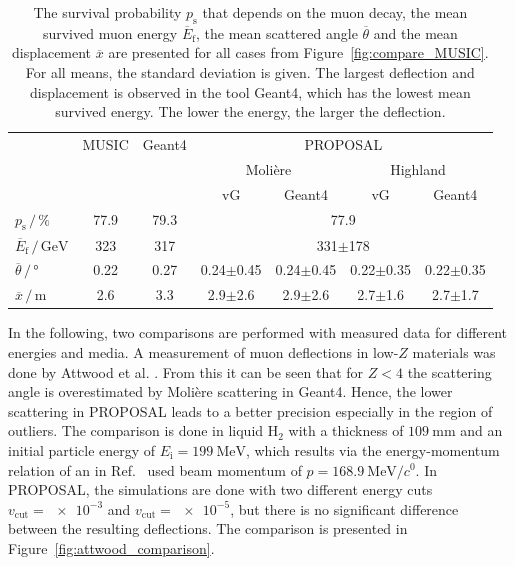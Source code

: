 \begin{table}
    \small
    \centering
    \caption{The survival probability $p_{\text{s}}$ that depends on the muon decay, the mean survived muon 
    energy $\overline{E}_{\text{f}}$, the mean scattered angle $\overline{\theta}$ 
    and the mean displacement $\overline{x}$ are presented for all cases from 
    Figure~\ref{fig:compare_MUSIC}. For all means, the standard deviation is given.
    The largest deflection and displacement is observed in the tool Geant4, which has the lowest mean survived energy. The lower the energy, the larger the deflection.}
    \begin{tabular}{l|cc|cccc}
        \toprule
        & MUSIC & Geant4 & \multicolumn{4}{c}{PROPOSAL} \\
        &  & & \multicolumn{2}{c}{Molière} & \multicolumn{2}{c}{Highland} \\
        &  &  & vG & Geant4 & vG & Geant4 \\
        \midrule
        $p_{\text{s}}\,/\,\si{\percent}$ & 77.9 & 79.3 &  \multicolumn{4}{c}{77.9}\\
        $\overline{E}_{\text{f}}\,/\,\si{\giga\electronvolt}$ & 323 & 317 & \multicolumn{4}{c}{331$\pm$178} \\
        $\overline{\theta}\,/\,\si{\degree}$ & 0.22 & 0.27 & 0.24$\pm$0.45 & 0.24$\pm$0.45 & 0.22$\pm$0.35 & 0.22$\pm$0.35   \\
        $\overline{x}\,/\,\si{\meter}$ & 2.6 & 3.3 & 2.9$\pm$2.6 & 2.9$\pm$2.6 & 2.7$\pm$1.6 & 2.7$\pm$1.7  \\
     \bottomrule
    \end{tabular}
    \label{tab:compare_MUSIC}
\end{table}

In the following, two comparisons are performed with measured data for 
different energies and media.
A measurement of muon deflections in low-$Z$ materials was done by Attwood et al. \cite{attwood_2006}. 
From this it can be seen that for $Z < 4$ the scattering angle is overestimated 
by Molière scattering in Geant4. Hence, the lower scattering in PROPOSAL leads 
to a better precision especially in the region of outliers. The comparison is 
done in liquid $\text{H}_2$ with a thickness of $\SI{109}{\milli\meter}$ and an 
initial particle energy of $E_{\mathrm{i}} = \SI{199}{\mega\electronvolt}$, which 
results via the energy-momentum relation of an in Ref.~\cite{attwood_2006} used beam momentum 
of $p = \SI[per-mode=symbol]{168.9}{\mega\electronvolt\per\clight}$. 
In PROPOSAL, the simulations are done with two different energy cuts $v_{\mathrm{cut}} = \num{e-3}$ and $v_{\mathrm{cut}} = \num{e-5}$, 
but there is no significant difference between the resulting deflections.
The comparison is presented in Figure~\ref{fig:attwood_comparison}.

